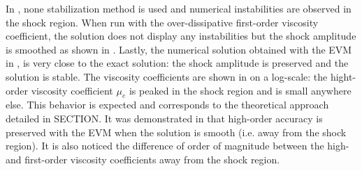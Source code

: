 In , none stabilization method is used and numerical instabilities are observed in the shock region. When run with the over-dissipative first-order viscosity coefficient, the solution does not display any instabilities but the shock amplitude is smoothed as shown in . Lastly, the numerical solution obtained with the EVM in , is very close to the exact solution: the shock amplitude is preserved and the solution is stable. The viscosity coefficients are shown in  on a log-scale: the hight-order viscosity coefficient $\mu_e$ is peaked in the shock region and is small anywhere else. This behavior is expected and corresponds to the theoretical approach detailed in SECTION. It was demonstrated in \cite{valentin} that high-order accuracy is preserved with the EVM when the solution is smooth (i.e. away from the shock region). It is also noticed the difference of order of magnitude between the high- and first-order viscosity coefficients away from the shock region.
%
